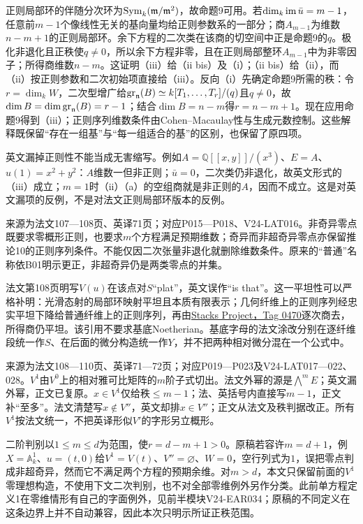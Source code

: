 正则局部环的伴随分次环为$\operatorname{Sym}_k(\mathfrak m/\mathfrak m^2)$，故命题9可用。若$\dim_k\operatorname{im}\bar u=m-1$，任意前$m-1$个像线性无关的基向量均给正则参数系的一部分；商$A_{m-1}$为维数$n-m+1$的正则局部环。余下方程的二次类在该商的切空间中正是命题9的$q$。极化非退化且正秩使$q\ne0$，所以余下方程非零，且在正则局部整环$A_{m-1}$中为非零因子；所得商维数$n-m$。这证明（iii）给（ii bis）及（i）；（ii bis）给（ii），而（ii）按正则参数和二次初始项直接给（iii）。反向（i）先确定命题9所需的秩：令$r=\dim_kW$，二次型增广给$\operatorname{gr}_{\mathfrak n}(B)\simeq k[T_1,\ldots,T_r]/(q)$且$q\ne0$，故$\dim B=\dim\operatorname{gr}_{\mathfrak n}(B)=r-1$；结合$\dim B=n-m$得$r=n-m+1$。现在应用命题9得到（iii）；正则序列维数条件由Cohen--Macaulay性与生成元数控制。这些解释既保留“存在一组基”与“每一组适合的基”的区别，也保留了原四项。

英文漏掉正则性不能当成无害缩写。例如$A=\mathbb Q[[x,y]]/(x^3)$、$E=A$、$u(1)=x^2+y^2$：$A$维数一但非正则；$\bar u=0$，二次类仍非退化，故英文形式的（iii）成立；$m=1$时（ii）（a）的空组商就是非正则的$A$，因而不成立。这是对英文漏项的反例，不是对法文正则局部环版本的反例。

来源为法文107—108页、英译71页；对应P015—P018、V24-LAT016。非奇异零点既要求零概形正则，也要求$m$个方程满足预期维数；奇异而非超奇异零点亦保留推论10的正则序列条件。不能仅因二次张量非退化就删除维数条件。原来的“普通”名称依B01明示更正，非超奇异仍是两类零点的并集。

法文第108页明写$V(u)$在该点对$S$“plat”，英文误作“is that”。这一平坦性可以严格补明：光滑态射的局部环映射平坦且本质有限表示；几何纤维上的正则序列经忠实平坦下降给普通纤维上的正则序列，再由\href{https://stacks.math.columbia.edu/tag/0470}{Stacks Project，Tag 0470}逐次商去，所得商仍平坦。该引用不要求基底Noetherian。基底字母的法文涂改分别在逐纤维段统一作$S$、在后面的微分构造统一作$Y$，并不把两种相对微分混在一个公式中。

来源为法文108—110页、英译71—72页；对应P019—P023及V24-LAT017—022、028。$V^1$由$V^0$上的相对雅可比矩阵的$m$阶子式切出。法文外幂的源是$\bigwedge^mE$；英文漏外幂，正文已复原。$x\in V^1$仅给秩$\le m-1$；法、英括号内直接写$m-1$，正文补“至多”。法文清楚写$x\notin V''$，英文却排$x\in V''$；正文从法文及秩判据改正。所有$V^1$按法文统一，不把英译形似$V'$的字形另立概形。

二阶判别以$1\le m\le d$为范围，使$r=d-m+1>0$。原稿若容许$m=d+1$，例$X=\mathbb A^1_k$、$u=(t,0)$给$V^1=V(t)$、$V''=\varnothing$、$W=0$，空行列式为$1$，误把零点判成非超奇异，然而它不满足两个方程的预期余维。对$m>d$，本文只保留前面的$V^1$零理想构造，不使用下文二次判别，也不对全部零维例外另作分类。此前单方程定义1在零维情形有自己的字面例外，见前半模块V24-EAR034；原稿的不同定义在这条边界上并不自动兼容，因此本次只明示所证正秩范围。

